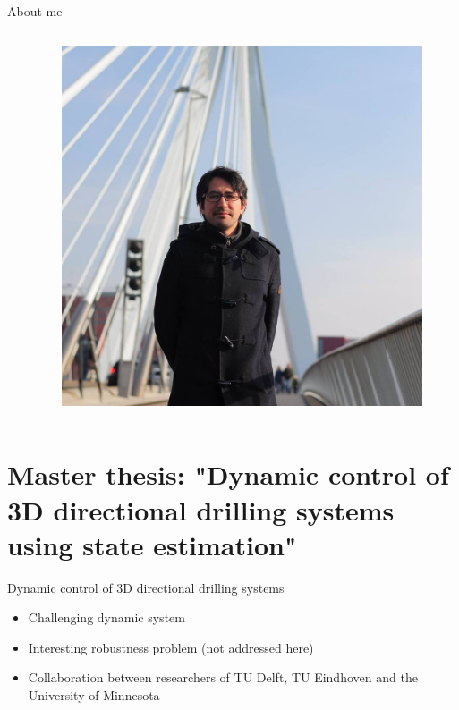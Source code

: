 \documentclass[10pt]{beamer}
\begin{document}
\begin{frame}{About me}
\begin{columns}
\begin{column}{0.6\textwidth}
\begin{itemize}
\begin{itemize}
				\end{itemize}
			\end{itemize}
		\end{column}
		\begin{column}{0.4\textwidth}
			\begin{figure}[ht]
				\vspace{-59.3pt}
				\includegraphics[width=1.5\textwidth]{images/yo.jpg}
			\end{figure}			
		\end{column}
	\end{columns}
\end{frame}
\section{Master thesis: "Dynamic control of 3D directional drilling systems using state estimation"}

\begin{frame}{Dynamic control of 3D directional drilling systems}
	\begin{itemize}\setlength\itemsep{2.5em}
		\item Challenging dynamic system
		\item Interesting robustness problem (not addressed here)
		\item Collaboration between researchers of TU Delft, TU Eindhoven and the University of Minnesota
	\end{itemize}
\end{frame}
\end{document}

